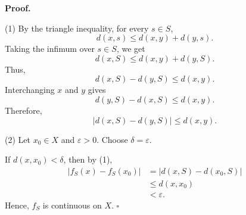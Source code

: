 
\textbf{Proof.}

(1) By the triangle inequality, for every $s\in S$,
\[ d(x,s)\leq d(x,y)+d(y,s). \]
Taking the infimum over $s\in S$, we get
\[ d(x,S)\leq d(x,y)+d(y,S). \]
Thus,
\[ d(x,S)-d(y,S)\leq d(x,y). \]
Interchanging $x$ and $y$ gives
\[ d(y,S)-d(x,S)\leq d(x,y). \]
Therefore,
\[ \boxed{|d(x,S)-d(y,S)|\leq d(x,y).} \]

(2) Let $x_0\in X$ and $\varepsilon>0$. Choose $\delta=\varepsilon$.

If $d(x,x_0)<\delta$, then by (1),
\[
\begin{aligned}
|f_S(x)-f_S(x_0)|
&=|d(x,S)-d(x_0,S)|\\
&\leq d(x,x_0)\\
&<\varepsilon.
\end{aligned}
\]
Hence, $f_S$ is continuous on $X$. \hfill $\square$
